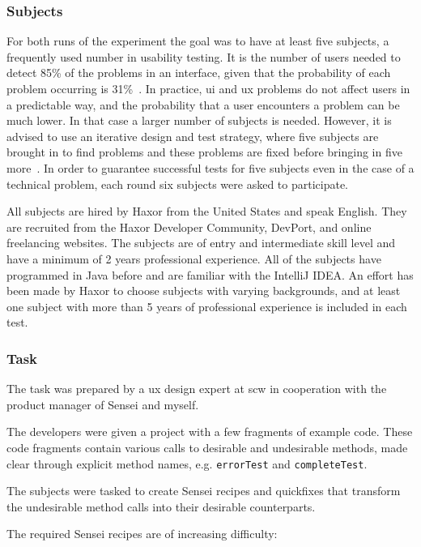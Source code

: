 \subsubsection{Subjects}
For both runs of the experiment the goal was to have at least five subjects, a frequently used number in usability testing.
It is the number of users needed to detect 85\% of the problems in an interface, given that the probability of each problem occurring is 31\%~\cite{nielsen1993mathematical}.
In practice, \gls{ui} and \gls{ux} problems do not affect users in a predictable way, and the probability that a user encounters a problem can be much lower.
In that case a larger number of subjects is needed.
However, it is advised to use an iterative design and test strategy, where five subjects are brought in to find problems and these problems are fixed before bringing in five more~\cite{nielsen1993mathematical}.
In order to guarantee successful tests for five subjects even in the case of a technical problem, each round six subjects were asked to participate.

All subjects are hired by Haxor from the United States and speak English.
They are recruited from the Haxor Developer Community, DevPort, and online freelancing websites.
The subjects are of entry and intermediate skill level and have a minimum of 2 years professional experience.
All of the subjects have programmed in Java before and are familiar with the IntelliJ IDEA.
An effort has been made by Haxor to choose subjects with varying backgrounds, and at least one subject with more than 5 years of professional experience is included in each test.

\subsubsection{Task}
The task was prepared by a \gls{ux} design expert at \gls{scw} in cooperation with the product manager of Sensei and myself.

The developers were given a project with a few fragments of example code.
These code fragments contain various calls to desirable and undesirable methods, made clear through explicit method names, e.g. \texttt{errorTest} and \texttt{completeTest}.

The subjects were tasked to create Sensei recipes and quickfixes that transform the undesirable method calls into their desirable counterparts.

The required Sensei recipes are of increasing difficulty:

